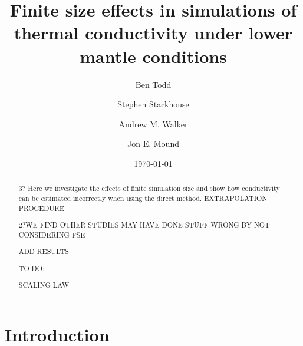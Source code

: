 \documentclass[%
preprint,                                  %
nofootinbib,
 amsmath,amssymb,
 aps,
]{revtex4-1}
\begin{document}
\newcommand{\wmk}{Wm$^{-1}$K$^{-1}$}


\title{Finite size effects in simulations of thermal conductivity under lower mantle conditions}%

\author{Ben Todd}
\author{Stephen Stackhouse}
\author{Andrew M. Walker}
\author{Jon E. Mound}


\date{\today}%

\begin{abstract}


3? Here we investigate the effects of finite simulation size and show how conductivity can be estimated incorrectly when using the direct method. EXTRAPOLATION PROCEDURE

2?WE FIND OTHER STUDIES MAY HAVE DONE STUFF WRONG BY NOT CONSIDERING FSE


ADD RESULTS

TO DO:

SCALING LAW

\end{abstract}

\maketitle




\section{\label{sec:intro}Introduction}
\end{document}
